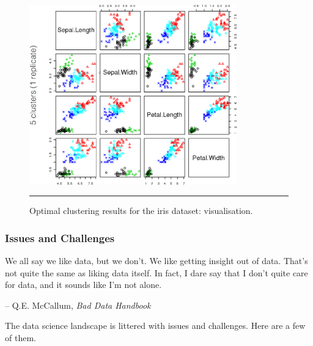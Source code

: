 \begin{figure}[!t]
\centering
\includegraphics[width=0.8\textwidth]{images/DSML/clustering20.png} \caption[\small Optimal clustering results for the iris dataset: visualisation]{\small Optimal clustering results for the iris dataset: visualisation.}\hrule\label{fig:clust20}
\end{figure}
\afterpage{\FloatBarrier}
\newpage\noindent
\subsubsection{Issues and Challenges}
\begin{tcolorbox}[title=The Stench of Bad Data]
We all say we like data, but we don't. We like getting insight out of data. That's not quite the same as liking data itself. In fact, I dare say that I don't quite care for data, and it sounds like I'm not alone. \\[-0.6cm]
\begin{flushright}
-- Q.E. McCallum, \textit{Bad Data Handbook}
\end{flushright}
\end{tcolorbox}
\noindent The data science landscape is littered with issues and challenges. Here are a few of them. 
